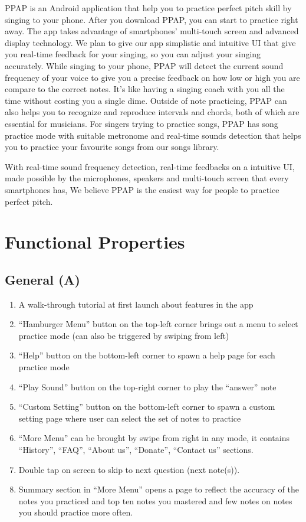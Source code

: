 \documentclass{article}
\begin{document}
PPAP is an Android application that help you to practice perfect pitch skill by singing to your phone. After you download PPAP, you can start to practice right away. The app takes advantage of smartphones’ multi-touch screen and advanced display technology. We plan to give our app simplistic and intuitive UI that give you real-time feedback for your singing, so you can adjust your singing accurately. While singing to your phone, PPAP will detect the current sound frequency of your voice to give you a precise feedback on how low or high you are compare to the correct notes. It’s like having a singing coach with you all the time without costing you a single dime. Outside of note practicing, PPAP can also helps you to recognize and reproduce intervals and chords, both of which are essential for musicians. For singers trying to practice songs, PPAP has song practice mode with suitable metronome and real-time sounds detection that helps you to practice your favourite songs from our songs library.

\qquad

With real-time sound frequency detection, real-time feedbacks on a intuitive UI, made possible by the microphones, speakers and multi-touch screen that every smartphones has, We believe PPAP is the easiest way for people to practice perfect pitch.

\newpage
\section{Functional Properties}
\subsection{General (A)}
\begin{enumerate}
  \item A walk-through tutorial at first launch about features in the app
  \item “Hamburger Menu” button on the top-left corner brings out a menu to select practice mode (can also be triggered by swiping from left)
  \item “Help” button on the bottom-left corner to spawn a help page for each practice mode
  \item “Play Sound” button on the top-right corner to play the “answer” note
  \item “Custom Setting” button on the bottom-left corner to spawn a custom setting page where user can select the set of notes to practice
  \item “More Menu” can be brought by swipe from right in any mode, it contains “History”, “FAQ”, “About us”, “Donate”, “Contact us” sections.
  \item Double tap on screen to skip to next question (next note(s)).
  \item Summary section in “More Menu” opens a page to reflect the accuracy of the notes you practiced and top ten notes you mastered and few notes on notes you should practice more often. 
\end{enumerate}
\end{document}
